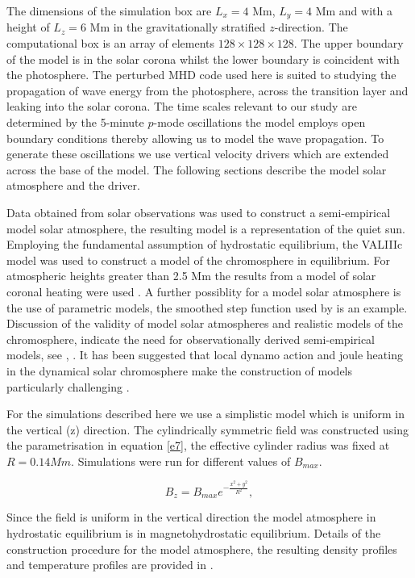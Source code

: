 \documentclass[linenumbers]{aastex63}
\begin{document}
 The dimensions of the simulation box are $L_{ x}= 4$ Mm,  $L_{y} =4$ Mm and with a height of $L_{z} =6$ Mm in the gravitationally stratified $z$-direction. The computational box is an array of elements $128 \times128 \times128 $. The upper boundary of the model is in the solar corona whilst the lower boundary is coincident with the photosphere. The perturbed MHD code used here is suited to studying the propagation of wave energy from the photosphere, across the transition layer and leaking into the solar corona. The time scales relevant to our study are determined by the 5-minute $p$-mode oscillations the model employs open boundary conditions thereby allowing us to model the wave propagation. To generate these oscillations we use vertical velocity drivers which are extended across the base of the model. The following sections describe the model solar atmosphere and the driver.

Data obtained from solar observations was used to construct a semi-empirical model solar atmosphere, the resulting model is a representation of the quiet sun. Employing the fundamental assumption of hydrostatic equilibrium, the VALIIIc model \citet{Vernazza1981} was used to construct a model of the chromosphere in equilibrium. For atmospheric heights greater than 2.5 Mm the results from a model of solar coronal heating were used \citep[see][]{McWhirter1975}. A further possiblity for a model solar atmosphere is the use of parametric models, the smoothed step function used by \citet{Murawski2010} is an example. Discussion of the validity of model solar atmospheres and realistic models of the chromosphere,  indicate the need for observationally derived semi-empirical models, see \citet{Carlsson1995}, \citet{Kalkofen2012}. It has been suggested that local dynamo action and joule heating in the dynamical solar chromosphere make the construction of models particularly challenging \citet{Leenaarts2011}.

For the simulations described here we use a simplistic model which is uniform in the vertical (z) direction. The cylindrically symmetric field was constructed using  the parametrisation in equation \ref{e7}, the effective cylinder radius was fixed at $R=0.14Mm$. Simulations were run for different values of $B_{max}$.

\begin{equation}
B_{z}=B_{max} e^{-\frac{x^2+y^2}{R^2}} , \label{e7}
\end{equation}

Since the field is uniform in the vertical direction the model atmosphere in hydrostatic equilibrium is in magnetohydrostatic equilibrium. Details of the construction procedure for the model atmosphere, the resulting density profiles and temperature profiles are provided in \citet{Griffiths2018b}. 
 
\end{document}

